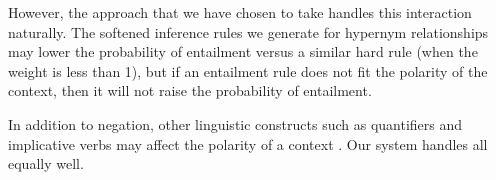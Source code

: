 However, the approach that we have chosen to take handles this interaction
naturally.  The softened inference rules we generate for hypernym relationships
may lower the probability of entailment versus a similar hard rule (when the
weight is less than 1), but if an entailment rule does not fit the polarity of
the context, then it will not raise the probability of entailment.

In addition to negation, other linguistic constructs such as quantifiers and
implicative verbs may affect the polarity of a context
\citep{maccartney:iwcs2009}.  Our system handles all equally well.

